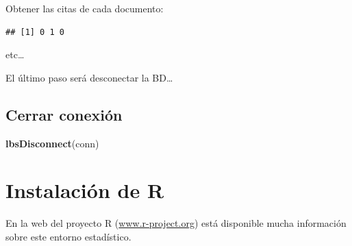 \documentclass[
]{book}
\newenvironment{Shaded}{\begin{snugshade}}{\end{snugshade}}
\newcommand{\ControlFlowTok}[1]{\textcolor[rgb]{0.13,0.29,0.53}{\textbf{#1}}}
\newcommand{\KeywordTok}[1]{\textcolor[rgb]{0.13,0.29,0.53}{\textbf{#1}}}
\newcommand{\NormalTok}[1]{#1}
\newcommand{\OperatorTok}[1]{\textcolor[rgb]{0.81,0.36,0.00}{\textbf{#1}}}
\newcommand{\StringTok}[1]{\textcolor[rgb]{0.31,0.60,0.02}{#1}}
\begin{document}
Obtener las citas de cada documento:

\begin{Shaded}
\end{Shaded}

\begin{verbatim}
## [1] 0 1 0
\end{verbatim}

etc\ldots{}

El último paso será desconectar la BD\ldots{}

\hypertarget{cerrar-conexiuxf3n}{%
\section{Cerrar conexión}\label{cerrar-conexiuxf3n}}

\begin{Shaded}
\begin{Highlighting}[]
\KeywordTok{lbsDisconnect}\NormalTok{(conn)}
\end{Highlighting}
\end{Shaded}

\hypertarget{instalaciuxf3n-de-r}{%
\chapter{Instalación de R}\label{instalaciuxf3n-de-r}}

En la web del proyecto R
(\href{http://www.r-project.org}{www.r-project.org}) está disponible
mucha información sobre este entorno estadístico.
\end{document}
